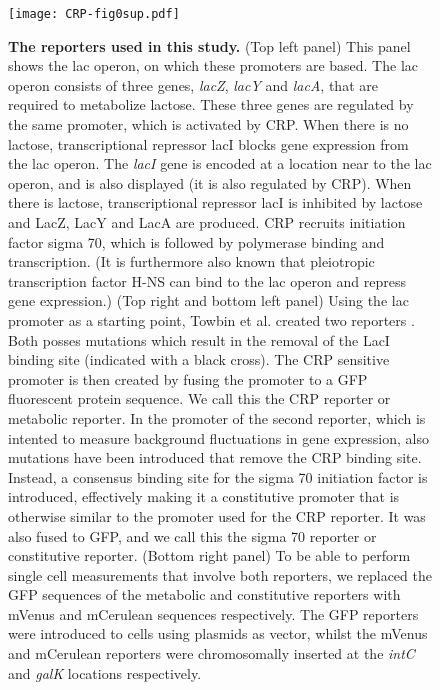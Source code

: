 \begin{figure}
    \centering
    \texttt{[image: CRP-fig0sup.pdf]}
    \caption{ 
        \textbf{The reporters used in this study.}
        (Top left panel) This panel shows the lac operon, on which these promoters are based.
        The lac operon consists of three genes, \textit{lacZ}, \textit{lacY} and \textit{lacA}, that are required to metabolize lactose.
        These three genes are regulated by the same promoter, which is activated by CRP. 
        When there is no lactose, transcriptional repressor lacI blocks gene expression from the lac operon.
        The \textit{lacI} gene is encoded at a location near to the lac operon, and is also displayed (it is also regulated by CRP).
        When there is lactose, transcriptional repressor lacI is inhibited by lactose and LacZ, LacY and LacA are produced.
        CRP recruits initiation factor sigma 70, which is followed by polymerase binding and transcription.
        (It is furthermore also known that pleiotropic transcription factor H-NS can bind to the lac operon and repress gene expression.)
        (Top right and bottom left panel) Using the lac promoter as a starting point, Towbin et al. created two reporters \cite{Towbin2017}.
        Both posses mutations which result in the removal of the LacI binding site (indicated with a black cross).
        The CRP sensitive promoter is then created by fusing the promoter to a GFP fluorescent protein sequence.
        We call this the CRP reporter or metabolic reporter.
        In the promoter of the second reporter, which is intented to measure background fluctuations in gene expression, also mutations have been introduced that remove the CRP binding site. Instead, a consensus binding site for the sigma 70 initiation factor is introduced, effectively making it a constitutive promoter that is otherwise similar to the promoter used for the CRP reporter. It was also fused to GFP, and we call this the sigma 70 reporter or constitutive reporter.
        (Bottom right panel) To be able to perform single cell measurements that involve both reporters, we replaced the GFP sequences of the metabolic and constitutive reporters with mVenus and mCerulean sequences respectively. 
        The GFP reporters were introduced to cells using plasmids as vector,
        whilst the mVenus and mCerulean reporters were chromosomally inserted at the \textit{intC} and \textit{galK} locations respectively.
    }
    \label{fig:CRP:fig0sup}
\end{figure}



